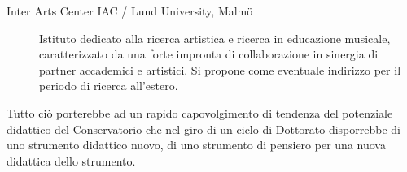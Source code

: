 \documentclass{gs-adonis}
\begin{document}
\begin{description}
  \item[Inter Arts Center IAC / Lund University, Malmö] Istituto dedicato alla ricerca
  artistica e ricerca in educazione musicale, caratterizzato da una forte impronta
  di collaborazione in sinergia di partner accademici e artistici.
  Si propone come eventuale indirizzo per il periodo di ricerca all'estero.


\end{description}






Tutto ciò porterebbe ad un rapido capovolgimento di tendenza del potenziale
didattico del Conservatorio che nel giro di un ciclo di Dottorato disporrebbe
di uno strumento didattico nuovo, di uno strumento di pensiero per una nuova
didattica dello strumento.

\end{document}
